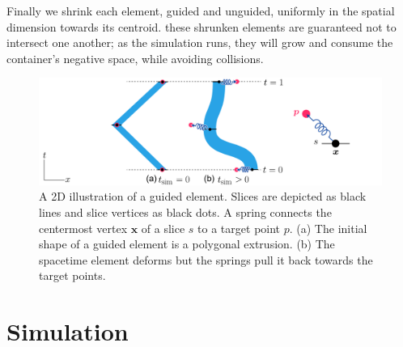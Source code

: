 
Finally we shrink each element, guided and unguided, uniformly in the spatial dimension
towards its centroid.  
 these shrunken elements are
guaranteed not to intersect one another; as the simulation runs, they
will grow and consume the container's negative space, while avoiding collisions.

\begin{figure}
\centering
\includegraphics[width=1.0\textwidth]{figures/animationpak/guided_element.pdf} 
\caption[A 2D illustration of a guided element]{
\label{fig_animationpak_guided_element} A 2D illustration of a guided element.
Slices are depicted as black lines and slice vertices as black dots.
A spring connects the centermost vertex $\bm{x}$ of a slice $s$ to a target
point $p$.
(a) The initial shape of a guided element is a polygonal extrusion.
(b) The spacetime element deforms but the springs pull it back towards
the target points.}
\end{figure}




\section{Simulation}
\label{animationpak_simulation}


